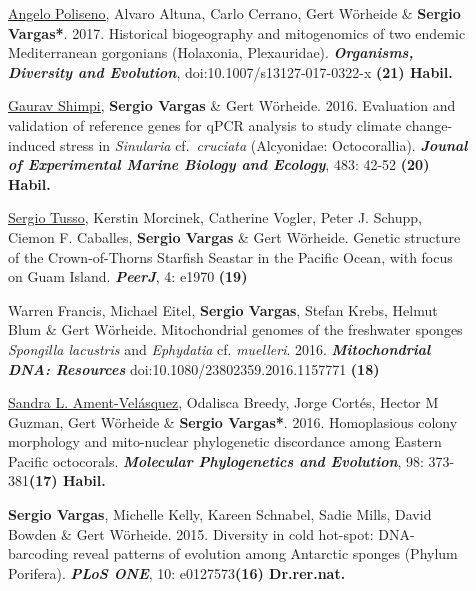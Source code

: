 \documentclass[letter,10pt]{article}
\begin{document}
\begin{description}
\item[]\underline{\underline{Angelo Poliseno}}, Alvaro Altuna, Carlo Cerrano, Gert W\"orheide \& \textbf{Sergio Vargas*}. 2017. Historical biogeography and mitogenomics of two endemic Mediterranean gorgonians (Holaxonia, Plexauridae). \textbf{\emph{Organisms, Diversity and Evolution}}, doi:10.1007/s13127-017-0322-x \hfill\textbf{{\scriptsize (21) Habil.}}

\item[]\underline{\underline{Gaurav Shimpi}}, \textbf{Sergio Vargas} \& Gert W\"orheide. 2016. Evaluation and validation of reference genes for qPCR analysis to study climate change-induced stress in \emph{Sinularia} cf.~\emph{cruciata} (Alcyonidae: Octocorallia). \textbf{\emph{Jounal of Experimental Marine Biology and Ecology}}, 483: 42-52 \hfill\textbf{{\scriptsize (20) Habil.}}

\item[]\underline{Sergio Tusso}, Kerstin Morcinek, Catherine Vogler, Peter J. Schupp,  Ciemon F. Caballes, \textbf{Sergio Vargas} \& Gert W\"orheide. Genetic structure of the Crown-of-Thorns Starfish Seastar in the Pacific Ocean, with focus on Guam Island. \textbf{\emph{PeerJ}}, 4: e1970 \hfill\textbf{{\scriptsize (19)}}

\item[]Warren Francis, Michael Eitel, \textbf{Sergio Vargas}, Stefan Krebs, Helmut Blum \& Gert W\"orheide. Mitochondrial genomes of the freshwater sponges \emph{Spongilla lacustris} and \emph{Ephydatia} cf. \emph{muelleri}. 2016. \textbf{\emph{Mitochondrial DNA: Resources}} doi:10.1080/23802359.2016.1157771 \hfill\textbf{{\scriptsize (18)}}

\item[]\underline{Sandra L. Ament-Vel\'asquez}, Odalisca Breedy, Jorge Cort\'es, Hector M Guzman, Gert W\"orheide \& \textbf{Sergio Vargas*}. 2016. Homoplasious colony morphology and mito-nuclear phylogenetic discordance among Eastern Pacific octocorals. \textbf{\emph{Molecular Phylogenetics and Evolution}}, 98: 373-381\hfill\textbf{{\scriptsize (17) Habil.}}

\item[]\textbf{Sergio Vargas}, Michelle Kelly, Kareen Schnabel, Sadie Mills, David Bowden \& Gert W\"orheide. 2015. Diversity in cold hot-spot: DNA-barcoding reveal patterns of evolution among Antarctic sponges (Phylum Porifera). \textbf{\emph{PLoS ONE}}, 10: e0127573\hfill\textbf{{\scriptsize (16) Dr.rer.nat.}}


\end{description}
\end{document}
